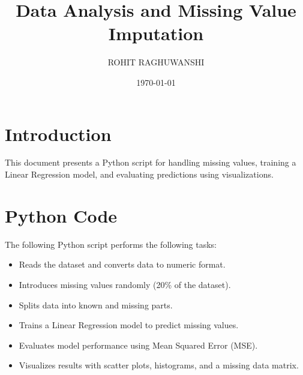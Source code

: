 \documentclass{article}
\title{Data Analysis and Missing Value Imputation}
\author{ROHIT RAGHUWANSHI}
\date{\today}
\begin{document}
\maketitle

\section{Introduction}
This document presents a Python script for handling missing values, training a Linear Regression model, and evaluating predictions using visualizations.

\section{Python Code}

The following Python script performs the following tasks:
\begin{itemize}
    \item Reads the dataset and converts data to numeric format.
    \item Introduces missing values randomly (20\% of the dataset).
    \item Splits data into known and missing parts.
    \item Trains a Linear Regression model to predict missing values.
    \item Evaluates model performance using Mean Squared Error (MSE).
    \item Visualizes results with scatter plots, histograms, and a missing data matrix.
\end{itemize}
\end{document}
